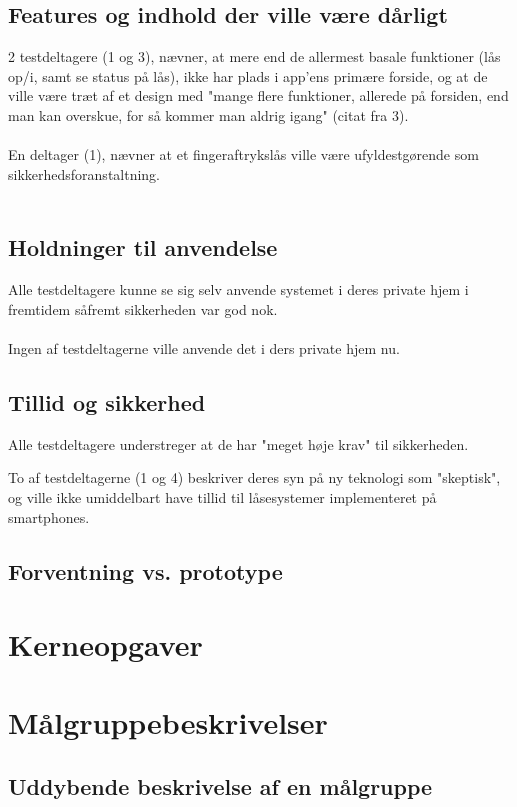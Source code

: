 \documentclass[a4paper,12pt]{article}
\begin{document}
\subsection{Features og indhold der ville være dårligt}
2 testdeltagere (1 og 3), nævner, at mere end de allermest basale funktioner (lås op/i, samt se status på lås), ikke har plads i app'ens primære forside, og at de ville være træt af et design med "mange flere funktioner, allerede på forsiden, end man kan overskue, for så kommer man aldrig igang" (citat fra 3).
\\ \\
En deltager (1), nævner at et fingeraftrykslås ville være ufyldestgørende som sikkerhedsforanstaltning.
\\ \\

\subsection{Holdninger til anvendelse}
Alle testdeltagere kunne se sig selv anvende systemet i deres private hjem i fremtidem såfremt sikkerheden var god nok. 
\\ \\
Ingen af testdeltagerne ville anvende det i ders private hjem nu.
\subsection{Tillid og sikkerhed}

Alle testdeltagere understreger at de har "meget høje krav" til sikkerheden.

To af testdeltagerne (1 og 4) beskriver deres syn på ny teknologi som "skeptisk", og ville ikke umiddelbart have tillid til låsesystemer implementeret på smartphones.

\subsection{Forventning vs. prototype}

\section{Kerneopgaver}

\section{Målgruppebeskrivelser}
\subsection{Uddybende beskrivelse af en målgruppe}
\end{document}

